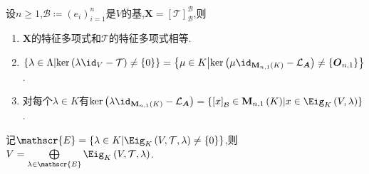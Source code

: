 \begin{remark}{}{}
	设$n\geq 1$,$\mathcal{B}\coloneq\left(e_{i}\right)_{i=1}^{n}$是$V$的基,$\boldsymbol{X}=\left[\mathcal{T}\right]_{\mathcal{B}}^{\mathcal{B}}$,则
	\begin{enumerate}
		\item $\boldsymbol{X}$的特征多项式和$\mathcal{T}$的特征多项式相等.
		\item $\left\{\lambda\in\Lambda\middle|\ker\left(\lambda\id_{V}-\mathcal{T}\right)\neq\left\{0\right\}\right\}=\left\{\mu\in K\middle|\ker\left(\mu\id_{\mathbf{M}_{n,1}\left(K\right)}-\mathcal{L}_{\boldsymbol{A}}\right)\neq\left\{\boldsymbol{O}_{n,1}\right\}\right\}$.
		\item 对每个$\lambda\in K$有$\ker\left(\lambda\id_{\mathbf{M}_{n,1}\left(K\right)}-\mathcal{L}_{\boldsymbol{A}}\right)=\left\{\left[x\right]_{\mathcal{B}}\in\mathbf{M}_{n,1}\left(K\right)\middle|x\in\Eig_{K}\left(V,\lambda\right)\right\}$.
	\end{enumerate}
\end{remark}

\begin{proposition}{}{}
	记$\mathscr{E}=\left\{\lambda\in K\middle|\Eig_{K}\left(V,\mathcal{T},\lambda\right)\neq\left\{0\right\}\right\}$,则$V=\bigoplus\limits_{\lambda\in\mathscr{E}}\Eig_{K}\left(V,\mathcal{T},\lambda\right)$.
\end{proposition}
































